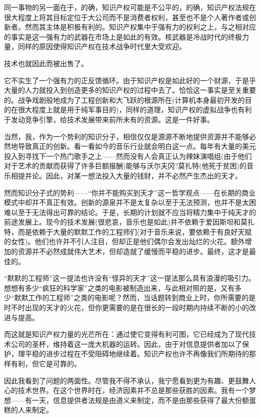 同一事物的另一面在于，的确，知识产权可能是不公平的，的确，知识产权法规在很大程度上将其目标定位于大公司而不是消费者权利，甚至也不是个人著作者或创新者。然而其主体是积极有利的。知识产权集中于强有力的权利之上，与之相对应的事实是这一强有力的武器在市场上是如此的有效。核武器是冷战时代的终极力量，同样的原因使得知识产权在技术战争时代里大受欢迎。

技术也就因此而被出售了。

它不实生了一个强有力的正反馈循环。由于知识产权是如此好的一个财源，于是乎大量的人力就投入到创造更多的知识产权的过程中去了。恰恰这一事实是至关重要的。战争戏剧般地成为了工程创新和大飞跃的根源所在(计算机本身最初开发的目的在很大程度上就是用于纯军事目的)，同样的道理，知识产权的虚拟战争也有利于发动竞争引擎，给技术发展带来前所未有的资源。这是一件好事。

当然，我，作为一个势利的知识分子，相信仅仅是源源不断地提供资源并不能够必然地导致真正的创新。看一看如今的音乐行业就会明白这一点。每年有大量的美元投入到寻找下一个热门歌手之上——然而没有人会真正认为辣妹演唱组(由于他们对于艺术的贡献而获得了许多巨额报酬)能够与沃尔夫冈?莫扎特(他死于贫困)的音乐相提并论。因此，对某一想法投入大量的钱财，并不必然产生杰出的天才。

然而知识分子式的势利——“你并不能购买到天才”这一哲学观点——在长期的商业模式中却并不真正有效。创新的源泉并不是太复杂以至于无法预测，也并不是太困难以至于无法得出可靠的结论。于是，长期的计划就不应当将精力集中于纯天才的前途发展上。现今的技术发展(很悲哀，音乐也是如此)并不依赖于爱因斯坦和莫扎特，而是依赖于大量的默默工作的工程师们(对于音乐来说，要依赖于有良好天赋的女性)。他们也许并不引人注目，但却正是他们偶尔会发出灿烂的火花。额外增加的资源并不必然成就伟大艺术，但却造就了缓慢而平稳的进步。最终，这才是最佳的。

“默默的工程师”这一提法也许没有“怪异的天才”这一提法那么具有浪漫的吸引力。想想有多少“疯狂的科学家”之类的电影被制造出来，与此相对照的是，又有多少“默默工作的工程师”之类的电影呢？然而，当话题转到商业上时，你所需要的是时不时出现的天才的火花，但你更需要的是在很长的一段时期内持续不断的小的改进与提高。

而这就是知识产权力量的光芒所在：通过使它变得有利可图，它已经成为了现代技术公司的圣杯，维持着这一庞大机器的运转。因此，由于对信息提供者加以了保护，理平稳的进步过程在不受阻碍地继续着。知识产权也许不再像我们所期待的那样有利，但它是可靠的。

因此我看到了问题的两面性。尽管我不得不承认，我宁愿看到更为有趣、更鼓舞人心的技术世界。在这个世界时在，经济因素并不总是那些获胜的因素。我有一个梦想——有一天，信息提供者法规是由道义来制定，而不是由那些获得了最大份额蛋糕的人来制定。

